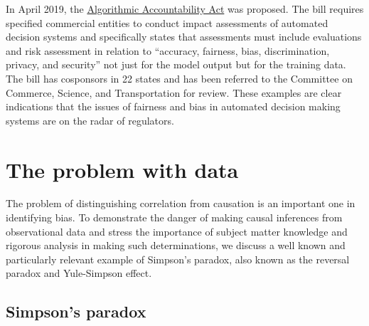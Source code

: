 In April 2019, the \href{https://www.congress.gov/bill/116th-congress/house-bill/2231}{Algorithmic Accountability Act} was proposed. The bill requires specified commercial entities to conduct impact assessments of automated decision systems and specifically states that assessments must include evaluations and risk assessment in relation to ``accuracy, fairness, bias, discrimination, privacy, and security'' not just for the model output but for the training data. The bill has cosponsors in 22 states and has been referred to the Committee on Commerce, Science, and Transportation for review. These examples are clear indications that the issues of fairness and bias in automated decision making systems are on the radar of regulators.

\section{The problem with data} \label{sec_SimpsParadox}

The problem of distinguishing correlation from causation is an important one in identifying bias. To demonstrate the danger of making causal inferences from observational data and stress the importance of subject matter knowledge and rigorous analysis in making such determinations, we discuss a well known and particularly relevant example of Simpson's paradox\cite{Berkeley}, also known as the reversal paradox and Yule-Simpson effect.

\subsection{Simpson's paradox}

